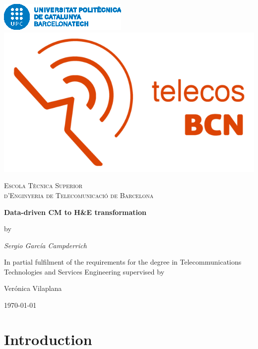 \documentclass[a4paper,12pt,titlepage,twoside]{article}
\begin{document}
\begin{titlepage}
  \centering
   \includegraphics[height=0.05\textheight]{logo_barcelonatech}\hspace{0.5cm}
   \includegraphics[height=0.05\textheight]{logo_telecos_2018}\par\vspace{1cm}
  {\scshape\LARGE Escola Tècnica Superior \\ d'Enginyeria de Telecomunicació de Barcelona \par}
  \vspace{3mm}
  {\huge\bfseries Data-driven CM to H\&E transformation\par}
  \vspace{2cm}
  by\par
  {\Large\itshape Sergio García Campderrich\par}
  In partial fulfilment of the requirements for the degree in Telecommunications Technologies and Services Engineering
  \vfill
  supervised by\par
  Verónica Vilaplana

  \vfill

  {\large \today\par}
\end{titlepage}

\clearpage
\thispagestyle{empty}
\null\newpage
{}

\section{Introduction}

\end{document}
